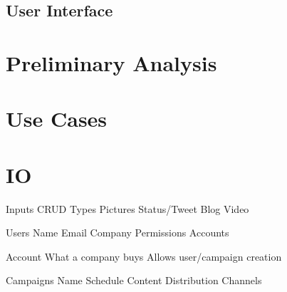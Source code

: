 \documentclass{article}
\begin{document}
	\subsection{User Interface}

\section{Preliminary Analysis}

\section{Use Cases}

\section{IO}

Inputs
  CRUD
  Types
    Pictures
    Status/Tweet
    Blog
    Video

Users
  Name
  Email
  Company
  Permissions
  Accounts
    
Account
  What a company buys
  Allows user/campaign creation
  
Campaigns
  Name
  Schedule
  Content
    Distribution Channels
\end{document}
